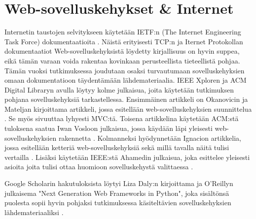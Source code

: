 \documentclass[utf8]{gradu3}
\begin{document}
\section{Web-sovelluskehykset \& Internet}
Internetin taustojen selvitykseen käytetään IETF:n (The Internet Engineering Task Force) dokumentaatioita \parencite{ietf}. Näistä erityisesti TCP:n ja Iternet Protokollan dokumentaatiot Web-sovelluskehyksistä löydetty kirjallisuus on hyvin
suppea, eikä tämän varaan voida rakentaa kovinkaan perusteellista
tieteellistä pohjaa. Tämän vuoksi tutkimuksessa joudutaan osaksi turvautumaan
sovelluskehyksien omaan dokumentatioon täydentämään
lähdemateriaalia. IEEE Xploren ja ACM Digital Libraryn avulla löytyy kolme julkaisua, 
joita käytetään tutkimuksen pohjana sovelluskehyksiä
tarkastellessa. Ensimmäinen artikkeli on Okanovicin ja Mateljan
kirjoittama artikkeli, jossa esitellään web-sovelluskehyksien suunnittelua \parencite{ockanovic}. 
Se myös sivuuttaa lyhyesti MVC:tä. Toisena artikkelina käytetään ACM:stä tuloksena saatua Iwan
Vosloon julkaisua, jossa käydään läpi yleisesti web-sovelluskehyksien
rakennetta \parencite{vosloo}. Kolmanneksi hyödynnetään Ignacion artikkelia, jossa esitellään ketteriä
web-sovelluskehyksiä sekä millä tavalla näitä tulisi vertailla \parencite{ignacio}. Lisäksi käytetään
IEEE:stä Ahamedin julkaisua, joka esittelee yleisesti asioita joita tulisi ottaa huomioon sovelluskehystä 
valittaessa \parencite{towards_framework}.

Google Scholarin hakutuloksista löytyi Liza Daly:n
kirjoittama ja O'Reillyn julkaisema "Next Generation Web Frameworks
in Python", joka sisältönsä puolesta sopii hyvin pohjaksi
tutkimuksessa käsiteltävien sovelluskehyksien lähdemateriaaliksi 
\parencite{liza}.
\end{document}
